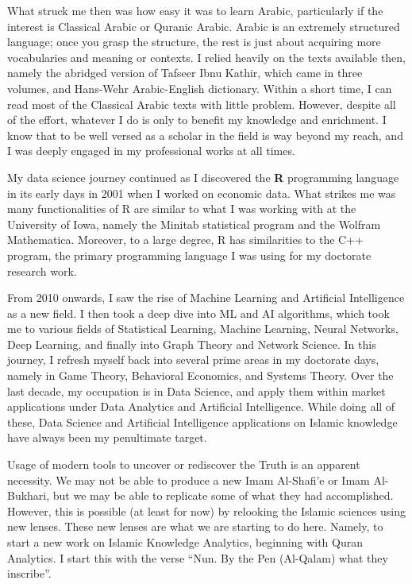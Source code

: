 \documentclass[
]{article}
\begin{document}
What struck me then was how easy it was to learn Arabic, particularly if the interest is Classical Arabic or Quranic Arabic. Arabic is an extremely structured language; once you grasp the structure, the rest is just about acquiring more vocabularies and meaning or contexts. I relied heavily on the texts available then, namely the abridged version of Tafseer Ibnu Kathir, which came in three volumes, and Hans-Wehr Arabic-English dictionary. Within a short time, I can read most of the Classical Arabic texts with little problem. However, despite all of the effort, whatever I do is only to benefit my knowledge and enrichment. I know that to be well versed as a scholar in the field is way beyond my reach, and I was deeply engaged in my professional works at all times.

My data science journey continued as I discovered the \textbf{R} programming language in its early days in 2001 when I worked on economic data. What strikes me was many functionalities of R are similar to what I was working with at the University of Iowa, namely the Minitab statistical program and the Wolfram Mathematica. Moreover, to a large degree, R has similarities to the C++ program, the primary programming language I was using for my doctorate research work.

From 2010 onwards, I saw the rise of Machine Learning and Artificial Intelligence as a new field. I then took a deep dive into ML and AI algorithms, which took me to various fields of Statistical Learning, Machine Learning, Neural Networks, Deep Learning, and finally into Graph Theory and Network Science. In this journey, I refresh myself back into several prime areas in my doctorate days, namely in Game Theory, Behavioral Economics, and Systems Theory. Over the last decade, my occupation is in Data Science, and apply them within market applications under Data Analytics and Artificial Intelligence. While doing all of these, Data Science and Artificial Intelligence applications on Islamic knowledge have always been my penultimate target.

Usage of modern tools to uncover or rediscover the Truth is an apparent necessity. We may not be able to produce a new Imam Al-Shafi'e or Imam Al-Bukhari, but we may be able to replicate some of what they had accomplished. However, this is possible (at least for now) by relooking the Islamic sciences using new lenses. These new lenses are what we are starting to do here. Namely, to start a new work on Islamic Knowledge Analytics, beginning with Quran Analytics. I start this with the verse ``Nun. By the Pen (Al-Qalam) what they inscribe''.
\end{document}
